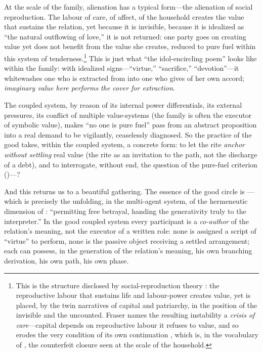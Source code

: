 At the scale of the family, alienation has a typical form---the alienation of social reproduction. The labour of care, of affect, of the household creates the value that sustains the relation, yet because it is invisible, because it is idealized as ``the natural outflowing of love,'' it is not returned: one party goes on creating value yet does not benefit from the value she creates, reduced to pure fuel within this system of tenderness.\footnote{This is the structure disclosed by social-reproduction theory \parencite{federici2004,bhattacharya2017}: the reproductive labour that sustains life and labour-power creates value, yet is placed, by the twin narratives of capital and patriarchy, in the position of the invisible and the uncounted. Fraser names the resulting instability a \emph{crisis of care}---capital depends on reproductive labour it refuses to value, and so erodes the very condition of its own continuation \parencite{fraser2017}, which is, in the vocabulary of , the counterfeit closure seen at the scale of the household.} This is just what ``the idol-encircling poem'' looks like within the family: with idealized signs---``virtue,'' ``sacrifice,'' ``devotion''---it whitewashes one who is extracted from into one who gives of her own accord; \emph{imaginary value here performs the cover for extraction}.

The coupled system, by reason of its internal power differentials, its external pressures, its conflict of multiple value-systems (the family is often the executor of symbolic value), makes ``no one is pure fuel'' pass from an abstract proposition into a real demand to be vigilantly, ceaselessly diagnosed. So the practice of the good takes, within the coupled system, a concrete form: to let the rite \emph{anchor without settling} real value (the rite as an invitation to the path, not the discharge of a debt), and to interrogate, without end, the question of the pure-fuel criterion ()---?

And this returns us to a beautiful gathering. The essence of the good circle is ---which is precisely the unfolding, in the multi-agent system, of the hermeneutic dimension of : ``permitting free betrayal, handing the generativity truly to the interpreter.'' In the good coupled system every participant is a \emph{co-author} of the relation's meaning, not the executor of a written role: none is assigned a script of ``virtue'' to perform, none is the passive object receiving a settled arrangement; each can possess, in the generation of the relation's meaning, his own branching derivation, his own path, his own phase. 
